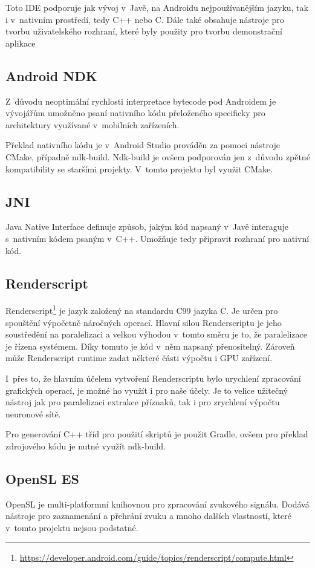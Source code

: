 Toto IDE podporuje jak vývoj v~Javě, na Androidu nejpoužívanějším jazyku, tak i v~nativním prostředí, tedy C++ nebo C. Dále také obsahuje nástroje pro tvorbu uživatelského rozhraní, které byly použity pro tvorbu demonstrační aplikace

\subsection{Android NDK}
Z~důvodu neoptimální rychlosti interpretace bytecode pod Androidem je vývojářům umožněno psaní nativního kódu přeloženého specificky pro architektury využívané v~mobilních zařízeních. 

Překlad nativního kódu je v~Android Studio prováděn za pomoci nástroje CMake, případně ndk-build. Ndk-build je ovšem podporován jen z~důvodu zpětné kompatibility se staršími projekty. V~tomto projektu byl využit CMake.

\subsection{JNI}\label{sec:jni}
Java Native Interface definuje způsob, jakým kód napsaný v~Javě interaguje s~nativním kódem psaným v~C++. Umožňuje tedy připravit rozhraní pro nativní kód.

\subsection{Renderscript}
Renderscript\footnote{\url{https://developer.android.com/guide/topics/renderscript/compute.html}} je jazyk založený na standardu C99 jazyka C. Je určen pro spouštění výpočetně náročných operací. Hlavní silou Renderscriptu je jeho soustředění na paralelizaci a velkou výhodou v~tomto směru je to, že paralelizace je řízena systémem. Díky tomuto je kód v~něm napsaný přenositelný. Zároveň může Renderscript runtime zadat některé části výpočtu i GPU zařízení.

I~přes to, že hlavním účelem vytvoření Renderscriptu bylo urychlení zpracování grafických operací, je možné ho využít i pro naše účely. Je to velice užitečný nástroj jak pro paralelizaci extrakce příznaků, tak i pro zrychlení výpočtu neuronové sítě.

Pro generování C++ tříd pro použití skriptů je použit Gradle, ovšem pro překlad zdrojového kódu je nutné využít ndk-build.

\subsection{OpenSL ES}
OpenSL je multi-platformní knihovnou pro zpracování zvukového signálu. Dodává nástroje pro zaznamenání a přehrání zvuku a mnoho dalších vlastností, které v~tomto projektu nejsou podstatné. 

